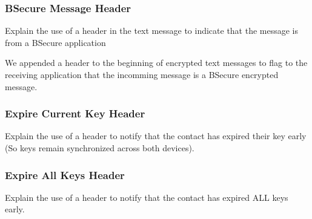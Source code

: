 \subsubsection{BSecure Message Header}
Explain the use of a header in the text message to indicate that the message is from a BSecure application

We appended a header to the beginning of encrypted text messages to flag to the receiving application that
the incomming message is a BSecure encrypted message.

\subsubsection{Expire Current Key Header}
Explain the use of a header to notify that the contact has expired their key early (So keys remain synchronized across both devices).

\subsubsection{Expire All Keys Header}
Explain the use of a header to notify that the contact has expired ALL keys early.


